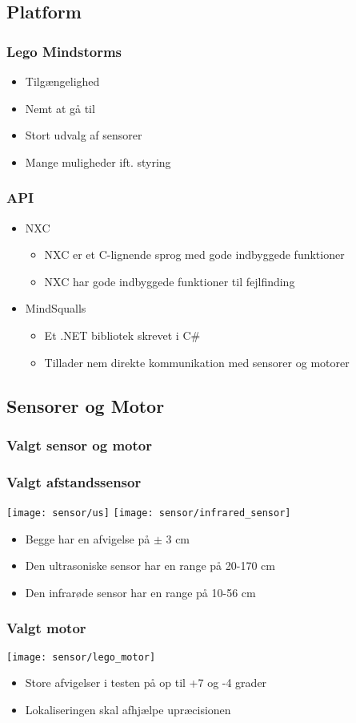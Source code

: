 \subsection{Platform}
\begin{frame}
\frametitle{Lego Mindstorms}
\begin{itemize}
\item Tilgængelighed
\item Nemt at gå til
\item Stort udvalg af sensorer
\item Mange muligheder ift. styring
\end{itemize}
\end{frame}

\begin{frame}
\frametitle{API}
\begin{itemize}
\item NXC
\begin{itemize}
\item NXC er et C-lignende sprog med gode indbyggede funktioner
\item NXC har gode indbyggede funktioner til fejlfinding
\end{itemize}
\item MindSqualls
\begin{itemize}
\item Et .NET bibliotek skrevet i C\#
\item Tillader nem direkte kommunikation med sensorer og motorer
\end{itemize}
\end{itemize}
\end{frame}
\subsection{Sensorer og Motor}
\frametitle{Valgt sensor og motor}
\begin{frame}
\frametitle{Valgt afstandssensor}
\center
\texttt{[image: sensor/us]}
\texttt{[image: sensor/infrared\_sensor]}
\begin{itemize}
\item Begge har en afvigelse på $\pm$ 3 cm
\item Den ultrasoniske sensor har en range på 20-170 cm
\item Den infrarøde sensor har en range på 10-56 cm
\end{itemize}
\end{frame}
\begin{frame}
\frametitle{Valgt motor}
\center
\texttt{[image: sensor/lego\_motor]}
\begin{itemize}
\item Store afvigelser i testen på op til +7 og -4 grader
\item Lokaliseringen skal afhjælpe upræcisionen
\end{itemize}
\end{frame}
